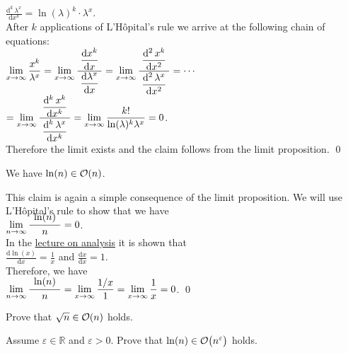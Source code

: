  $\displaystyle \frac{\mathrm{d}^k\,\lambda^{x}}{\mathrm{d}x^k} = \ln(\lambda)^k \cdot \lambda^x$. \\[0.2cm]
After $k$ applications of L'H\^opital's rule we arrive at the following chain of equations:
\\[0.2cm]
\hspace*{1.3cm} 
$\displaystyle 
\lim\limits_{x \rightarrow \infty} \frac{x^{k}}{\lambda^x} =
\lim\limits_{x \rightarrow \infty} \frac{\displaystyle\;\frac{\mathrm{d}x^{k}}{\mathrm{d}x}\;}{\displaystyle\frac{\mathrm{d}\lambda^x}{\mathrm{d}x}} =
\lim\limits_{x \rightarrow \infty} \frac{\displaystyle\;\frac{\mathrm{d}^2\,x^{k}}{\mathrm{d}x^2}\;}{\displaystyle\frac{\mathrm{d}^2\,\lambda^x}{\mathrm{d}x^2}} =
\cdots$
\\[0.3cm]
\hspace*{2.8cm}
$\displaystyle = 
\lim\limits_{x \rightarrow \infty} \frac{\displaystyle\;\frac{\mathrm{d}^k\,x^{k}}{\mathrm{d}x^k}\;}{\displaystyle\frac{\mathrm{d}^k\,\lambda^x}{\mathrm{d}x^k}} =
\lim\limits_{x \rightarrow \infty} \frac{k!}{\ln(\lambda)^k \lambda^x} = 0$.
\\[0.2cm] 
Therefore the limit exists and the claim follows from the limit proposition.
\qed

\example
We have $\ln(n) \in \mathcal{O}(n)$.
\ex

\proof
This claim is again a simple consequence of the limit proposition.  We will use L'H\^opital's rule
to show that we have
\\[0.4cm]
\hspace*{1.3cm} 
$\lim\limits_{n \rightarrow \infty} \bruch{\;\ln(n)\;}{n} = 0$.
\\[0.2cm]
In the \href{https://github.com/karlstroetmann/Analysis/blob/master/Skript/analysis.pdf}{lecture on analysis}
it is shown that \\[0.2cm] 
\hspace*{1.3cm} $\displaystyle \frac{\mathrm{d} \ln(x)}{\mathrm{d}x} = \frac{1}{x}$ 
\quad and \quad
 $\displaystyle \frac{\mathrm{d} x}{\mathrm{d}x} = 1$. \\[0.2cm]
Therefore, we have \\[0.2cm]
\hspace*{1.3cm} 
$\displaystyle \lim\limits_{n \rightarrow \infty} \bruch{\;\ln(n)\;}{n} = 
\lim\limits_{x \rightarrow \infty} \frac{1/x}{1} = 
\lim\limits_{x \rightarrow \infty} \frac{1}{x} = 0$. \qed


\exercise
Prove that $\sqrt{n} \in \mathcal{O}(n)$ holds.  \eox

\exercise
Assume $\varepsilon \in \mathbb{R}$ and $\varepsilon > 0$.  Prove that $\ln(n) \in
\mathcal{O}\bigl(n^{\varepsilon}\bigr)$ holds. \eox

